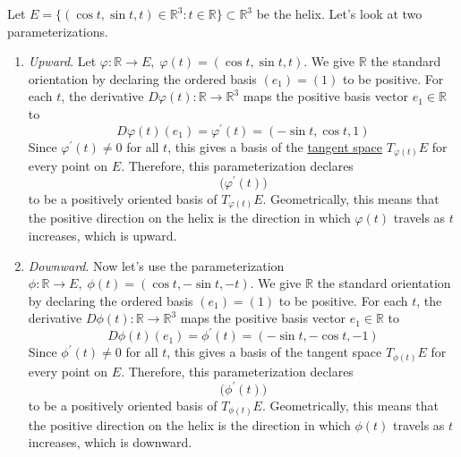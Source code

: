 	\begin{example}
	  \label{ex:orientation-of-curve-in-r3}
		Let $E = \{(\cos t, \sin t, t) \in \mathbb{R}^3 : t \in \mathbb{R}\} \subset \mathbb{R}^3$ be the helix. Let's look at two parameterizations. 
		\begin{enumerate}
			\item \textit{Upward}. Let $\varphi: \mathbb{R} \to E, \; \varphi(t) = (\cos t, \sin t, t)$. We give $\mathbb{R}$ the standard orientation by declaring the ordered basis $(e_1) = (1)$ to be positive. For each $t$, the derivative $D\varphi(t) : \mathbb{R} \to \mathbb{R}^3$ maps the positive basis vector $e_1 \in \mathbb{R}$ to
				\begin{equation}
					D\varphi(t)(e_1) = \varphi^\prime (t) = (-\sin{t}, \cos{t}, 1)
				\end{equation}
				Since $\varphi^\prime (t) \neq 0$ for all $t$, this gives a basis of the \hyperref[def:tangent-space]{tangent space} $T_{\varphi(t)} E$ for every point on $E$. Therefore, this parameterization declares
				\begin{equation}
					\big( \varphi^\prime (t) \big)
				\end{equation}
				to be a positively oriented basis of $T_{\varphi(t)}E$. Geometrically, this means that the positive direction on the helix is the direction in which $\varphi(t)$ travels as $t$ increases, which is upward.

			\item \textit{Downward}. Now let's use the parameterization $\phi: \mathbb{R} \to E, \; \phi(t) = (\cos t, -\sin t, -t)$. We give $\mathbb{R}$ the standard orientation by declaring the ordered basis $(e_1) = (1)$ to be positive. For each $t$, the derivative $D\phi(t) : \mathbb{R} \to \mathbb{R}^3$ maps the positive basis vector $e_1 \in \mathbb{R}$ to
				\begin{equation}
					D\phi(t)(e_1) = \phi^\prime (t) = (-\sin{t}, -\cos{t}, -1)
				\end{equation}
				Since $\phi^\prime (t) \neq 0$ for all $t$, this gives a basis of the tangent space $T_{\phi(t)} E$ for every point on $E$. Therefore, this parameterization declares
				\begin{equation}
					\big( \phi^\prime (t) \big)
				\end{equation}
				to be a positively oriented basis of $T_{\phi(t)}E$. Geometrically, this means that the positive direction on the helix is the direction in which $\phi(t)$ travels as $t$ increases, which is downward.
		\end{enumerate}
	\end{example}

